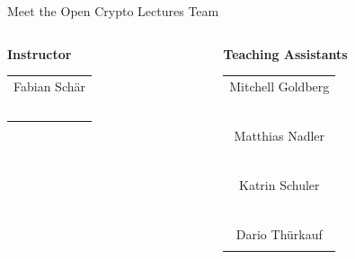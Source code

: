 \documentclass[handout]{beamer}
\begin{document}
\begin{frame}{Meet the Open Crypto Lectures Team}
	\begin{columns}[T]
		\begin{column}{0.31\textwidth}
			\center \textbf{\small{Instructor}}
			\begin{table}\small
				\begin{tabular}{c}
					Fabian Schär\\
					\href{https://linkedin.com/in/fabian-schaer/}{\faLinkedinSquare}\ \href{https://twitter.com/fschaer}{\faTwitterSquare}\\
				\end{tabular}
			\end{table}
		\end{column}
		\begin{column}{0.31\textwidth}
			\center \textbf{\small{Teaching Assistants}}
			\begin{table}\small
				\begin{tabular}{c}
					Mitchell Goldberg\\
					\href{https://linkedin.com/in/mitchell-goldberg/}{\faLinkedinSquare}\ \href{https://twitter.com/golmit_crypto}{\faTwitterSquare}\\
					\vspace{0.5em}\\
					Matthias Nadler\\
					\href{https://linkedin.com/in/mat-nadler/}{\faLinkedinSquare}\ \href{https://twitter.com/mat_nadler}{\faTwitterSquare}\\
					\vspace{0.5em}\\
					Katrin Schuler\\
					\href{https://linkedin.com/in/kmschuler/}{\faLinkedinSquare}\ \href{https://twitter.com/Katatcrypt}{\faTwitterSquare}\\
					\vspace{0.5em}\\
					Dario Thürkauf\\
					\href{https://linkedin.com/in/dario-thuerkauf/}{\faLinkedinSquare} \href{https://twitter.com/dario_thuerkauf}{\faTwitterSquare}\\
				\end{tabular}
			\end{table}

\end{column}
\end{columns}
\end{frame}
\end{document}
